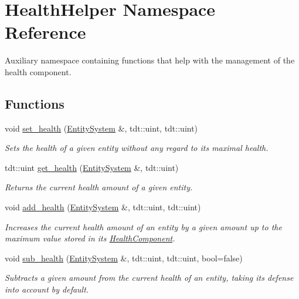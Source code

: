 \hypertarget{namespace_health_helper}{}\section{Health\+Helper Namespace Reference}
\label{namespace_health_helper}


Auxiliary namespace containing functions that help with the management of the health component.  


\subsection*{Functions}
\begin{DoxyCompactItemize}
\item 
void \hyperlink{namespace_health_helper_a120574d85b2de60f02c4cd21a999b5dc}{set\+\_\+health} (\hyperlink{class_entity_system}{Entity\+System} \&, tdt\+::uint, tdt\+::uint)
\begin{DoxyCompactList}\small\item\em Sets the health of a given entity without any regard to it\textquotesingle{}s maximal health. \end{DoxyCompactList}\item 
tdt\+::uint \hyperlink{namespace_health_helper_a69a0b47c5aef9f72d4b26945061c9edc}{get\+\_\+health} (\hyperlink{class_entity_system}{Entity\+System} \&, tdt\+::uint)
\begin{DoxyCompactList}\small\item\em Returns the current health amount of a given entity. \end{DoxyCompactList}\item 
void \hyperlink{namespace_health_helper_a6a2e6d9211d7908a1105d6886f987743}{add\+\_\+health} (\hyperlink{class_entity_system}{Entity\+System} \&, tdt\+::uint, tdt\+::uint)
\begin{DoxyCompactList}\small\item\em Increases the current health amount of an entity by a given amount up to the maximum value stored in it\textquotesingle{}s \hyperlink{struct_health_component}{Health\+Component}. \end{DoxyCompactList}\item 
void \hyperlink{namespace_health_helper_a8cf9b78e55f9bc6c11b850116a504244}{sub\+\_\+health} (\hyperlink{class_entity_system}{Entity\+System} \&, tdt\+::uint, tdt\+::uint, bool=false)
\begin{DoxyCompactList}\small\item\em Subtracts a given amount from the current health of an entity, taking it\textquotesingle{}s defense into account by default. \end{DoxyCompactList}\item 

\end{DoxyCompactItemize}
